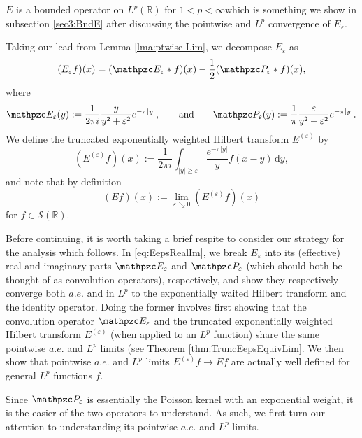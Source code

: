 \documentclass[../dissertation.tex]{subfiles}
\begin{document}
\begin{rmk}
	$E$ is a bounded operator on $L^p(\mathbb R)$ for $1 < p < \infty$\textemdash{}which 
	is something 
	we show in subsection \ref{sec3:BndE} after discussing the pointwise and $L^p$ 
	convergence of $E_\varepsilon$. 
\end{rmk}

Taking our lead from Lemma \ref{lma:ptwise-Lim}, we decompose $E_\varepsilon$ as  
\begin{align} \label{eq:EepsRealIm}
	(E_\varepsilon f)(x) 
		= (\mathpzc E_\varepsilon * f)(x) 
			- \frac{1}{2}(\mathpzc P_\varepsilon*f)(x),
\end{align}
where 
\[  \label{sym:badCauchy}
	\mathpzc E_\varepsilon(y) 
		:= \frac{1}{2\pi i} \frac{y}{y^2 + \varepsilon^2} e^{-\pi|y|}, 
	\qquad \text{and} \qquad
	\mathpzc P_\varepsilon(y) 
		:= \frac{1}{\pi} \frac{\varepsilon}{y^2 + \varepsilon^2} e^{-\pi|y|}.
\]
We define the truncated exponentially weighted Hilbert transform 
$E^{(\varepsilon)}$\label{sym:truncExpHil} by 
\[
	\left( E^{(\varepsilon)} f \right)(x) 
		:= \frac{1}{2\pi i} \int_{|y|\geq \varepsilon} \frac{e^{-\pi|y|}}{y} f(x - y) \, \mathrm{d}y,
\]
and note that by definition
\[
	(Ef)(x) 
		:= \lim_{\varepsilon \searrow 0} \left( E^{(\varepsilon)} f \right)(x)
\]
for $f \in \mathscr S(\mathbb R)$. 

\begin{rmk}
	Before continuing, it is worth taking a brief respite to consider our strategy for the 
	analysis which follows. In \eqref{eq:EepsRealIm}, we break $E_\varepsilon$ into its
	(effective) real and imaginary parts $\mathpzc E_{\varepsilon}$ and 
	$\mathpzc P_\varepsilon$
	(which should both be thought of as convolution operators), respectively, and show 
	they respectively converge both $a.e.$ and in $L^p$ to the exponentially waited 
	Hilbert transform and the identity operator. Doing the former involves first showing 
	that the convolution operator $\mathpzc E_{\varepsilon}$ and the truncated 
	exponentially weighted Hilbert transform $E^{(\varepsilon)}$ (when applied to an $L^p$ 
	function) share the same pointwise $a.e.$ and $L^p$ limits (see Theorem 
	\ref{thm:TruncEepsEquivLim}. We then show that pointwise $a.e.$ and $L^p$ 
	limits $E^{(\varepsilon)}f \to Ef$ are actually well defined for general $L^p$ 
	functions $f$.
\end{rmk}

Since $\mathpzc P_\varepsilon$ is essentially the Poisson kernel with an exponential weight, it 
is the easier of the two operators to understand. As such, we first turn our attention 
to understanding its pointwise $a.e.$ and $L^p$ limits.
\end{document}
